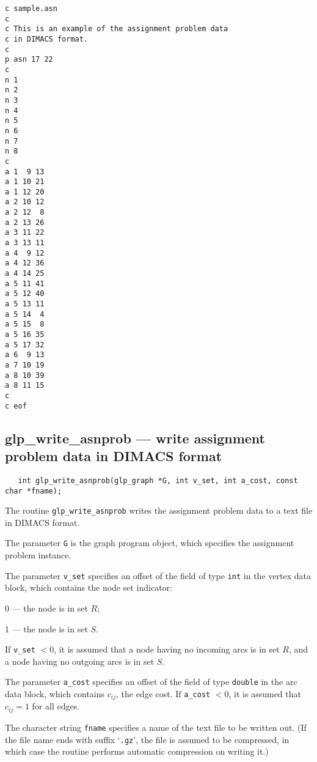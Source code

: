 \documentclass[11pt]{report}
\def\para#1{\noindent{\bf#1}}
\def\synopsis{\para{Synopsis}}
\def\description{\para{Description}}
\begin{document}
\begin{footnotesize}
\begin{verbatim}
c sample.asn
c
c This is an example of the assignment problem data
c in DIMACS format.
c
p asn 17 22
c
n 1
n 2
n 3
n 4
n 5
n 6
n 7
n 8
c
a 1  9 13
a 1 10 21
a 1 12 20
a 2 10 12
a 2 12  8
a 2 13 26
a 3 11 22
a 3 13 11
a 4  9 12
a 4 12 36
a 4 14 25
a 5 11 41
a 5 12 40
a 5 13 11
a 5 14  4
a 5 15  8
a 5 16 35
a 5 17 32
a 6  9 13
a 7 10 19
a 8 10 39
a 8 11 15
c
c eof
\end{verbatim}
\end{footnotesize}

\newpage

\subsection{glp\_write\_asnprob --- write assignment problem data in
DIMACS format}

\synopsis

\begin{verbatim}
   int glp_write_asnprob(glp_graph *G, int v_set, int a_cost, const char *fname);
\end{verbatim}

\description

The routine \verb|glp_write_asnprob| writes the assignment problem data
to a text file in DIMACS format.

The parameter \verb|G| is the graph program object, which specifies the
assignment problem instance.

The parameter \verb|v_set| specifies an offset of the field of type
\verb|int| in the vertex data block, which contains the node set
indicator:

0 --- the node is in set $R$;

1 --- the node is in set $S$.

\noindent
If \verb|v_set| $<0$, it is assumed that a node having no incoming arcs
is in set $R$, and a node having no outgoing arcs is in set $S$.

The parameter \verb|a_cost| specifies an offset of the field of type
\verb|double| in the arc data block, which contains $c_{ij}$, the edge
cost. If \verb|a_cost| $<0$, it is assumed that $c_{ij}=1$ for all
edges.

The character string \verb|fname| specifies a name of the text file to
be written out. (If the file name ends with suffix `\verb|.gz|', the
file is assumed to be compressed, in which case the routine performs
automatic compression on writing it.)
\end{document}
